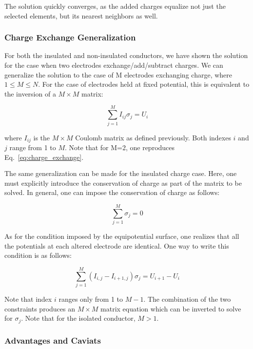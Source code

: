 The solution quickly converges, as the added charges equalize not just the selected elements, but its nearest neighbors as well.

\subsubsection{Charge Exchange Generalization}

For both the insulated and non-insulated conductors, we have shown the solution for the case when two electrodes exchange/add/subtract charges.  We can generalize the solution to the case of M electrodes exchanging charge, where $1 \le M \le N$.  For the case of electrodes held at fixed potential, this is equivalent to the inversion of a $M \times M$ matrix:

\begin{equation}
\sum_{j = 1}^{M} I_{ij} \sigma_j = U_i
\end{equation}

\noindent where $I_{ij}$ is the $M \times M$ Coulomb matrix as defined previously.  Both indexes $i$ and $j$ range from 1 to $M$. Note that for M=2, one reproduces Eq.~\ref{eq:charge_exchange}.

The same generalization can be made for the insulated charge case.  Here, one must explicitly introduce the conservation of charge as part of the matrix to be solved.   In general, one can impose the conservation of charge as follows:

\begin{equation}
\sum_{j=1}^{M} \sigma_j = 0
\end{equation}

As for the condition imposed by the equipotential surface, one realizes that all the potentials at each altered electrode are identical.  One way to write this condition is as follows:

\begin{equation}
\sum_{j=1}^{M}(I_{i,j} - I_{i+1,j}) \sigma_j = U_{i+1}-U_i
\end{equation}

Note that index $i$ ranges only from 1 to $M-1$.  The combination of the two constraints produces an $M \times M$ matrix equation which can be inverted to solve for $\sigma_j$.  Note that for the isolated conductor, $M > 1$.

\subsubsection{Advantages and Caviats}

